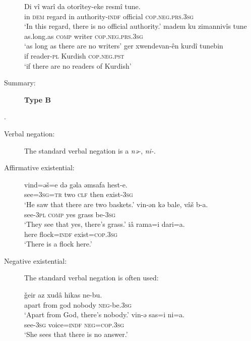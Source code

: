 \documentclass[output=paper,colorlinks,citecolor=brown]{langscibook}
\begin{document}
\begin{paperappendix}
\begin{unindented}
\begin{description}
\begin{exe}\ex \gll Di vî warî    da otorîtey-eke resmî   tune.  \\
in  \textsc{dem}    regard in  authority-\textsc{indf}  official \textsc{cop.neg.prs.3sg} \\
    \glt `In this regard, there is no official authority.' \citep[32]{Thackston2006}
\ex \gll madem ku zimannivîs tune \\
as.long.as  \textsc{comp}    writer \textsc{cop.neg.prs.3sg} \\
    \glt `as long as there are no writers' \citep[32]{Thackston2006}
\ex \gll ger xwendevan-ên kurdî tunebin \\
if reader-\textsc{pl} Kurdish  \textsc{cop.neg.pst} \\
    \glt `if there are no readers of Kurdish' \citep[31]{Thackston2006}
    \end{exe}

\item[Summary:] \textbf{Type B}
\end{description}

 \parencite{Paul2011}.
\begin{description}
\item[Verbal negation:] The standard verbal negation is a \textit{nə-}, \textit{ni-}.

\item[Affirmative existential:]

\begin{exe}\ex
    \gll vind=əš=e də   gəla əmsafa hest-e. \\
see=\textsc{3sg}=\textsc{tr} two \textsc{clf} then exist-\textsc{3sg} \\
    \glt `He saw that there are two baskets.' \citep[358]{Paul2011}
\ex \gll vin-ən kə bale, vâš    b-a. \\
see-\textsc{3pl} \textsc{comp}     yes   grass be-\textsc{3sg} \\
    \glt `They see that yes, there's grass.' \citep[210]{Paul2011}
\ex \gll iâ rama=i dari=a. \\
here flock=\textsc{indf} exist=\textsc{cop.3sg} \\
    \glt `There is a flock here.' \citep[243]{Paul2011}
    \end{exe}

\item [Negative existential:] The standard verbal negation is often used:
%
\begin{exe}\ex \gll ǧeir   az   xudâ hikas    ne-bu. \\
apart  from  god   nobody \textsc{neg}-be.\textsc{3sg} \\
    \glt `Apart from God, there's nobody.' \citep[176]{Paul2011}
\ex \gll vin-ə sas=i ni=a. \\
see-\textsc{3sg} voice=\textsc{indf}  \textsc{neg=cop.3sg} \\
    \glt `She sees that there is no answer.' \citep[422]{Paul2011}
    \end{exe}


\end{description}
\end{unindented}
\end{paperappendix}
\end{document}
